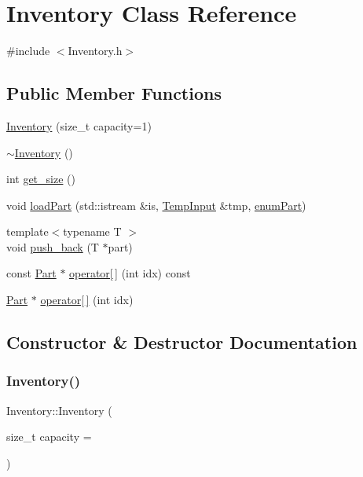 \hypertarget{class_inventory}{}\section{Inventory Class Reference}
\label{class_inventory}


{\ttfamily \#include $<$Inventory.\+h$>$}

\subsection*{Public Member Functions}
\begin{DoxyCompactItemize}
\item 
\mbox{\hyperlink{class_inventory_af2c8bea3c8fbf97fec4d3f5ffb92f347}{Inventory}} (size\+\_\+t capacity=1)
\item 
\mbox{\hyperlink{class_inventory_a6c6dfcb6d977c74a7abf46809e892e3d}{$\sim$\+Inventory}} ()
\item 
int \mbox{\hyperlink{class_inventory_a3ccacc9422b01b2c17836ca804bcaafc}{get\+\_\+size}} ()
\item 
void \mbox{\hyperlink{class_inventory_a9dd64f268a7a5cca611b5f749ec33f96}{load\+Part}} (std\+::istream \&is, \mbox{\hyperlink{struct_temp_input}{Temp\+Input}} \&tmp, \mbox{\hyperlink{_inventory_8h_abddff37837f171d72a2e16a1448a3943}{enum\+Part}})
\item 
{\footnotesize template$<$typename T $>$ }\\void \mbox{\hyperlink{class_inventory_a90cb96a50ebc28f0de4a009004e9b192}{push\+\_\+back}} (T $\ast$part)
\item 
const \mbox{\hyperlink{class_part}{Part}} $\ast$ \mbox{\hyperlink{class_inventory_a99b8be25beb3530c47d1faa913633979}{operator\mbox{[}$\,$\mbox{]}}} (int idx) const
\item 
\mbox{\hyperlink{class_part}{Part}} $\ast$ \mbox{\hyperlink{class_inventory_a86601b8ee999e78cdeea83431bab8f33}{operator\mbox{[}$\,$\mbox{]}}} (int idx)
\end{DoxyCompactItemize}


\subsection{Constructor \& Destructor Documentation}
\mbox{\label{class_inventory_af2c8bea3c8fbf97fec4d3f5ffb92f347}} 
\subsubsection{\texorpdfstring{Inventory()}{Inventory()}}
{\footnotesize\ttfamily Inventory\+::\+Inventory (\begin{DoxyParamCaption}\item[{size\+\_\+t}]{capacity = {} }\end{DoxyParamCaption})\hspace{0.3cm}{\ttfamily [inline]}}


